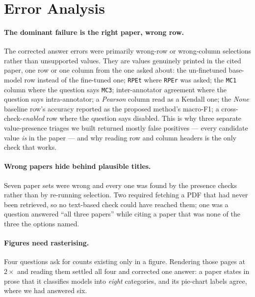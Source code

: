 \documentclass[11pt]{article}
\begin{document}
\section{Error Analysis}
\label{sec:errors}

\paragraph{The dominant failure is the right paper, wrong row.}
The corrected answer errors were primarily wrong-row or wrong-column selections
rather than unsupported values. They are values genuinely printed in the cited
paper, one row or one column from the one asked about: the un-finetuned base-model row instead of the fine-tuned one;
\texttt{RPEt} where \texttt{RPEr} was asked; the \texttt{MC1} column where the
question says \texttt{MC3}; inter-annotator agreement where the question says
intra-annotator; a \emph{Pearson} column read as a Kendall one; the \emph{None}
baseline row's accuracy reported as the proposed method's macro-F1; a
cross-check-\emph{enabled} row where the question says disabled. This is why
three separate value-presence triages we built returned mostly false positives
--- every candidate value \emph{is} in the paper --- and why reading row and
column headers is the only check that works.

\paragraph{Wrong papers hide behind plausible titles.}
Seven paper sets were wrong and every one was found by the presence checks rather
than by re-running selection. Two required fetching a PDF that had never been
retrieved, so no text-based check could have reached them; one was a question
answered ``all three papers'' while citing a paper that was none of the three the
options named.

\paragraph{Figures need rasterising.}
Four questions ask for counts existing only in a figure. Rendering those pages at
$2\times$ and reading them settled all four and corrected one answer: a paper
states in prose that it classifies models into \emph{eight} categories, and its
pie-chart labels agree, where we had answered six.
\end{document}
